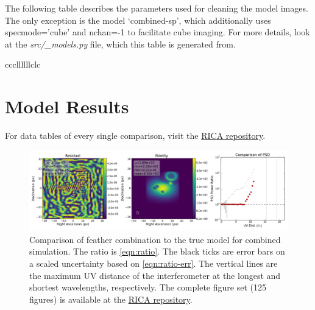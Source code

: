 \documentclass[manuscript,linenumbers]{aastex62}
\begin{document}
The following table describes the parameters used for cleaning the model images. The only exception is the model `combined-sp', which additionally uses specmode='cube' and nchan=-1 to facilitate cube imaging. For more details, look at the \textit{src/\_models.py} file, which this table is generated from.
\begin{longrotatetable}
    
    \label{tab:model-params}
    \begin{deluxetable}{cccllllllclc}
        
        \startdata
        
        \enddata
        \end{deluxetable}
\end{longrotatetable}

\section{Model Results}
\label{sec:model-results}

For data tables of every single comparison, visit the \href{https://gitlab.com/mileslucas/rica/tree/master/docs/static/ratios}{RICA repository}.



\begin{figure}[h!]
	\includegraphics[width=\textwidth]{figures/results/combined-ms__model_vs_feather}
	\caption{Comparison of feather combination to the true model for combined simulation. The ratio is \autoref{eqn:ratio}. The black ticks are error bars on a scaled uncertainty based on \autoref{eqn:ratio-err}. The vertical lines are the maximum UV distance of the interferometer at the longest and shortest wavelengths, respectively. The complete figure set (125 figures) is available at the \href{https://gitlab.com/mileslucas/rica/tree/master/docs/static/images/results}{RICA repository}.}
\end{figure}
\end{document}
